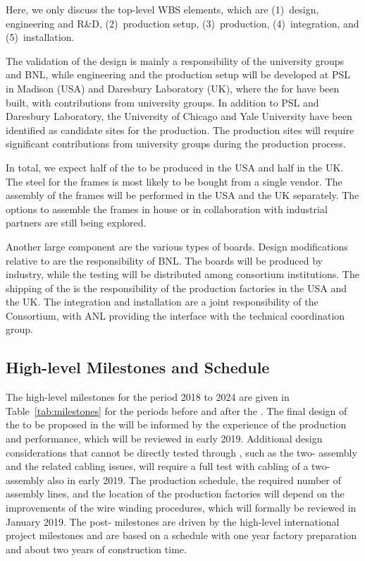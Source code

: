 Here, we only discuss the top-level WBS elements, which are (1)~design, engineering and R\&D, (2)~production setup, (3)~production, (4)~integration, and (5)~installation.

The validation of the design is mainly a responsibility of the university groups and BNL, while engineering and the production setup will be developed at PSL in Madison (USA) and Daresbury Laboratory (UK), where the  for  have been built, with contributions from university groups. In addition to PSL and Daresbury Laboratory, the University of Chicago and Yale University have been identified as candidate sites for the production. The production sites will require significant contributions from university groups during the production process. 

In total, we expect half of the  to be produced in the USA and half in the UK. The steel for the frames is most likely to be bought from a single vendor. The assembly of the frames will be performed in the USA and the UK separately. The options to assemble the frames in house or in collaboration with industrial partners are still being explored. 

Another large component are the various types of boards. Design modifications relative to  are the responsibility of BNL. The boards will be produced by industry, while the testing will be distributed among consortium institutions. The shipping of the  is the responsibility of the production factories in the USA and the UK.  The integration and installation are a joint responsibility of the Consortium, with ANL providing the interface with the technical coordination group.


\subsection{High-level Milestones and Schedule}
\label{sec:fdsp-apa-org-cs}

The high-level milestones for the period 2018 to 2024 are given in Table~\ref{tab:milestones} for the periods before and after the . The final design of the  to be proposed in the  will be informed by the experience of the   production and performance, which will be reviewed in early 2019. Additional design considerations that cannot be directly tested through , such as the two- assembly and the related cabling issues, will require a full test with cabling of a two- assembly also in early 2019. The production schedule, the required number of assembly lines, and the location of the production factories will depend on the improvements of the wire winding procedures, which will formally be reviewed in January 2019. The post- milestones are driven by the high-level international project milestones and are based on a schedule with one year factory preparation and about two years of  construction time.

